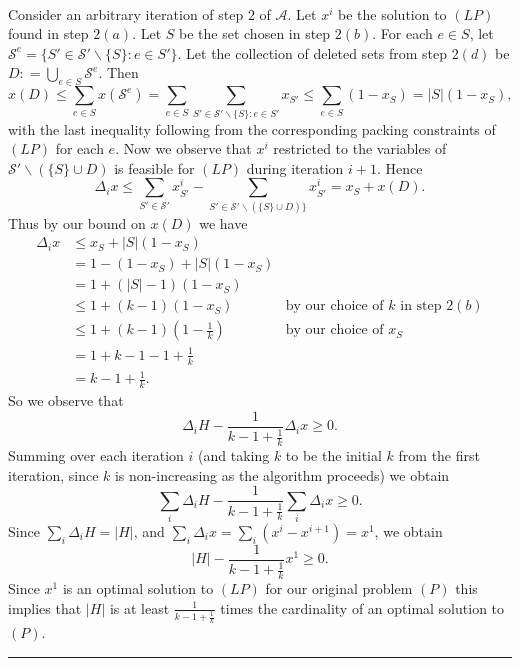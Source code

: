 \documentclass[letterpaper,12pt,oneside,onecolumn]{article}
\newcommand{\cA}{\mathcal{A}} \newcommand{\cB}{\mathcal{B}}
\newcommand{\cS}{\mathcal{S}} \newcommand{\cT}{\mathcal{T}}
\newenvironment{proof}{{\bf Proof:  }}{\hfill\rule{2mm}{2mm}}
\begin{document}
\begin{proof}
\paragraph{}
Consider an arbitrary iteration of step $2$ of $\cA$. Let $x^i$ be the solution to $(LP)$ found in step $2(a)$. Let $S$ be the set chosen in step $2(b)$. For each $e \in S$, let $\cS^e = \{S' \in \cS'\backslash\{S\} : e \in S'\}$. Let the collection of deleted sets from step $2(d)$ be $D: = \bigcup_{e\in S} \cS^e$. Then
$$x(D) \leq \sum_{e \in S} x(\cS^{e}) = \sum_{e\in S} \sum_{S' \in \cS'\backslash\{S\} : e\in S'} x_{S'} \leq \sum_{e \in S} (1 - x_S) = |S|(1-x_S),$$
with the last inequality following from the corresponding packing constraints of $(LP)$ for each $e$. Now we observe that $x^{i}$ restricted to the variables of $\cS' \backslash (\{S\} \cup D)$ is feasible for $(LP)$ during iteration $i+1$. Hence $$\Delta_i x \leq \sum_{S'\in \cS'} x^i_{S'} - \sum_{S' \in \cS'\backslash (\{S\} \cup D)\}} x^i_{S'} = x_S + x(D).$$
Thus by our bound on $x(D)$ we have
\begin{align*}
\Delta_i x &\leq x_S + |S|(1-x_S) \\
&= 1 - (1-x_S) + |S|(1-x_S) \\
&= 1 + (|S| -1)(1-x_S) \\
&\leq 1+(k - 1)(1-x_S) &\text{by our choice of $k$ in step $2(b)$} \\
&\leq 1 + (k-1)(1-\frac{1}{k}) &\text{by our choice of $x_S$} \\
&= 1 + k - 1 - 1 + \frac{1}{k} \\
&= k-1 + \frac{1}{k}.
\end{align*}
So we observe that $$\Delta_i H - \frac{1}{k-1+\frac{1}{k}}\Delta_i x \geq 0.$$
Summing over each iteration $i$ (and taking $k$ to be the initial $k$ from the first iteration, since $k$ is non-increasing as the algorithm proceeds) we obtain
$$\sum_i \Delta_i H - \frac{1}{k-1+\frac{1}{k}} \sum_i \Delta_i x \geq 0.$$
Since $\sum_i \Delta_i H = |H|$, and $\sum_i \Delta_i x = \sum_i (x^i - x^{i+1}) = x^1$, we obtain
$$|H| - \frac{1}{k-1+\frac{1}{k}}x^1 \geq 0.$$
Since $x^1$ is an optimal solution to $(LP)$ for our original problem $(P)$ this implies that $|H|$ is at least $\frac{1}{k-1+\frac{1}{k}}$ times the cardinality of an optimal solution to $(P)$.
\end{proof}

\section{}
\end{document}
